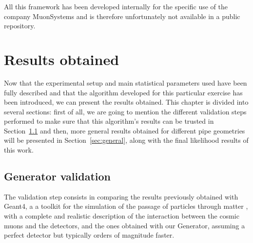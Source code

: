 \documentclass[a4paper, 11pt, twoside, openright]{report}
\begin{document}
All this framework has been developed internally for the specific use of the company MuonSystems and is therefore unfortunately not available in a public repository.










































\chapter{Results obtained} \label{chapter:results}

Now that the experimental setup and main statistical parameters used have been fully described and that the algorithm developed for this particular exercise has been introduced, we can present the results obtained. This chapter is divided into several sections: first of all, we are going to mention the different validation steps performed to make sure that this algorithm's results can be trusted in Section~\ref{sec:validation} and then, more general results obtained for different pipe geometries will be presented in Section~\ref{sec:general}, along with the final likelihood results of this work.

\section{Generator validation} \label{sec:validation}

The validation step consists in comparing the results previously obtained with Geant4, a a toolkit for the simulation of the passage of particles through matter \cite{Geant4}, with a complete and realistic description of the interaction between the cosmic muons and the detectors, and the ones obtained with our Generator, assuming a perfect detector but typically orders of magnitude faster.
\end{document}
